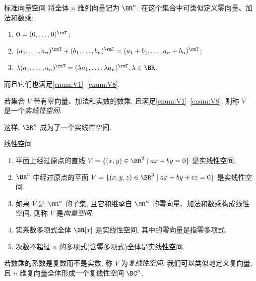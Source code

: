 \begin{frame}{标准向量空间\noexer}
	\onslide<+->
	将全体 $n$ 维列向量记为 $\BR^n$.
	\onslide<+->
	在这个集合中可类似定义零向量、加法和数乘:
	\begin{enumerate}
		\item ${\bf0}=(0,\dots,0)^\rmT$;
		\item $(a_1,\dots,a_n)^\rmT+(b_1,\dots,b_n)^\rmT=(a_1+b_1,\dots,a_n+b_n)^\rmT$;
		\item $\lambda(a_1,\dots,a_n)^\rmT=(\lambda a_1,\dots,\lambda a_n)^\rmT,\lambda\in\BR$.
	\end{enumerate}
	\onslide<+->
	而且它们也满足\ref{enum:V1}--\ref{enum:V8}.
	\onslide<+->
	\begin{definition}
		若集合 $V$ 带有零向量、加法和实数的数乘, 且满足\ref{enum:V1}--\ref{enum:V8}, 则称 $V$ 是一个\emph{实线性空间}.
	\end{definition}
	\onslide<+->
	这样, $\BR^n$ 成为了一个实线性空间.
\end{frame}


\begin{frame}{线性空间\noexer}
	\onslide<+->
	\begin{example}
		\begin{enumerate}
			\item 平面上经过原点的直线 $V=\{(x,y)\in\BR^2\mid ax+by=0\}$ 是实线性空间.
			\item $\BR^3$ 中经过原点的平面 $V=\{(x,y,z)\in\BR^3\mid ax+by+cz=0\}$ 是实线性空间.
			\item 如果 $V$ 是 $\BR^n$ 的子集, 且它和继承自 $\BR^n$ 的零向量、加法和数乘构成线性空间, 则称 $V$ 是\emph{向量空间}.
			\item 实系数多项式全体 $\BR[x]$ 是实线性空间, 其中的零向量是指零多项式.
			\item 次数不超过 $n$ 的多项式(含零多项式)全体是实线性空间.
		\end{enumerate}
	\end{example}
	\onslide<+->
	若数乘的系数是复数而不是实数, 称 $V$ 为\emph{复线性空间}.
	\onslide<+->
	我们可以类似地定义复向量, 且 $n$ 维复向量全体形成一个复线性空间 $\BC^n$.
\end{frame}


